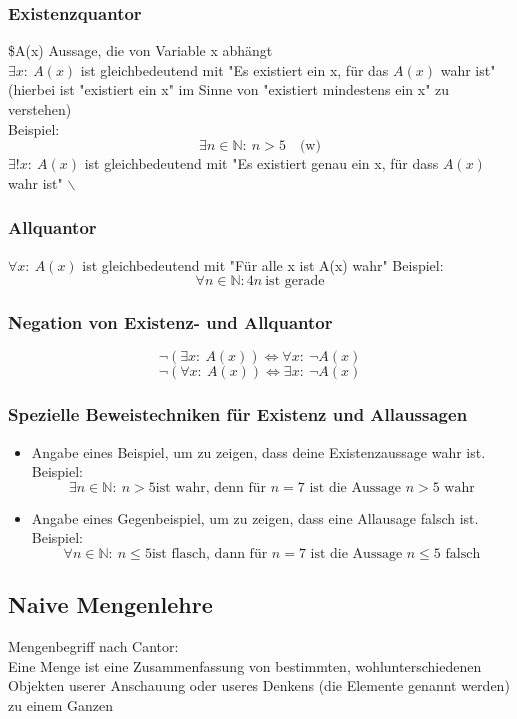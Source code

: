 \documentclass[a4paper]{scrartcl}
\DeclareMathOperator{\Forall}{\forall}
\begin{document}
\subsubsection{Existenzquantor}
\label{sec-2-3-1}
\$A(x) Aussage, die von Variable x abhängt \\
    $\exists x:~A(x)$ ist gleichbedeutend mit "Es existiert ein x, für das $A(x)$ wahr ist" (hierbei ist "existiert ein x" im Sinne von "existiert mindestens ein x" zu verstehen) \\
    Beispiel:
\[\exists n\in\mathbb{N}:~n>5\quad\text{(w)}\]
$\exists !x:~A(x)$ ist gleichbedeutend mit "Es existiert genau ein x, für dass $A(x)$ wahr ist" $\backslash$
\subsubsection{Allquantor}
\label{sec-2-3-2}
$\Forall x:~A(x)$ ist gleichbedeutend mit "Für alle x ist A(x) wahr"
Beispiel:
\[\Forall n\in\mathbb{N}: 4n~\text{ist gerade}\]
\subsubsection{Negation von Existenz- und Allquantor}
\label{sec-2-3-3}
\[\neg(\exists x:~A(x)) \Leftrightarrow \Forall x:~\neg A(x)\]
\[\neg(\Forall x:~A(x)) \Leftrightarrow \exists x:~\neg A(x)\]
\subsubsection{Spezielle Beweistechniken für Existenz und Allaussagen}
\label{sec-2-3-4}
\begin{itemize}
\item Angabe eines Beispiel, um zu zeigen, dass deine Existenzaussage wahr ist. \\
      Beispiel:
\[\exists n\in\mathbb{N}:~n>5 \text{ist wahr, denn für $n = 7$ ist die Aussage $n > 5$ wahr}\]
\item Angabe eines Gegenbeispiel, um zu zeigen, dass eine Allausage falsch ist. \\
      Beispiel:
\[\Forall n\in\mathbb{N}:~n\leq 5 \text{ist flasch, dann für $n=7$ ist die Aussage $n\leq 5$ falsch}\]
\end{itemize}
\subsection{Naive Mengenlehre}
\label{sec-2-4}
Mengenbegriff nach Cantor: \\
   Eine Menge ist eine Zusammenfassung von bestimmten, wohlunterschiedenen Objekten userer Anschauung oder useres Denkens (die Elemente genannt werden) zu einem Ganzen
\end{document}
